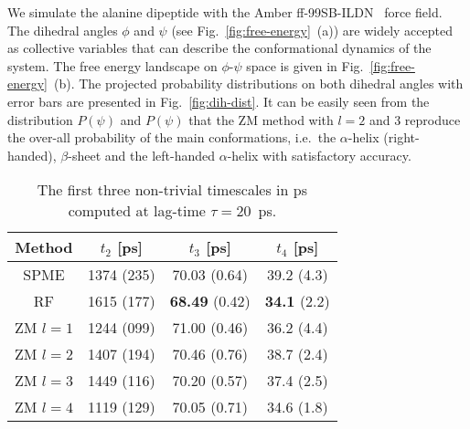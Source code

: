 \documentclass[aip,jcp,a4paper,reprint,unsortedaddress,onecolumn,fleqn]{revtex4-1}
\begin{document}
We simulate the alanine dipeptide with the Amber
ff-99SB-ILDN~\cite{lindorff2010improved} force field.  The dihedral
angles $\phi$ and $\psi$ (see Fig.~\ref{fig:free-energy}~(a)) are
widely accepted as collective variables that can describe the
conformational dynamics of the system.  The free energy landscape
on $\phi$-$\psi$ space is given in Fig.~\ref{fig:free-energy}~(b).  The projected
probability distributions on both dihedral angles
with error bars are presented in Fig.~\ref{fig:dih-dist}. It can be easily seen
from the distribution $P(\psi)$ and $P(\psi)$ that the ZM method with
$l=2$ and 3 reproduce the over-all probability of the main
conformations, i.e.~the $\alpha$-helix (right-handed), $\beta$-sheet and
the left-handed $\alpha$-helix with satisfactory accuracy.



\begin{table}
  \centering
  \caption{The first three non-trivial timescales in ps computed at lag-time $\tau = 20$~ps.
  }
  \begin{tabular*}{0.5\textwidth}{@{\extracolsep{\fill}}c   ccc}\hline\hline
    Method      &        $t_2$ [ps]  & $t_3$ [ps] &  $t_4$ [ps] \\\hline
    SPME        &         1374  (235)     &          70.03  (0.64)  &         39.2  (4.3)    \\
    RF          &        {1615} (177)     &  \textbf{68.49} (0.42)  & \textbf{34.1} (2.2)    \\
    ZM $l=1$    &        {1244} (099)     &         {71.00} (0.46)  &         36.2  (4.4)    \\
    ZM $l=2$    &         1407  (194)     &          70.46  (0.76)  &         38.7  (2.4)    \\
    ZM $l=3$    &         1449  (116)     &          70.20  (0.57)  &         37.4  (2.5)    \\
    ZM $l=4$    &        {1119} (129)     &          70.05  (0.71)  &         34.6  (1.8)    \\
    \hline\hline
  \end{tabular*}
  \label{tab:tmp3}
\end{table}
\end{document}
